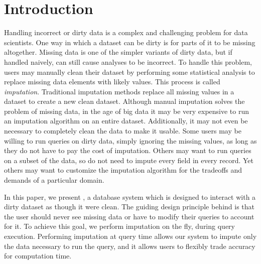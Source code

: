\section{Introduction}

Handling incorrect or dirty data is a complex and challenging problem for data scientists.
One way in which a dataset can be dirty is for parts of it to be missing altogether.
Missing data is one of the simpler variants of dirty data, but if handled naively, can still cause analyses to be incorrect.
To handle this problem, users may manually clean their dataset by performing
some statistical analysis to replace missing data elements with likely values.
This process is called \emph{imputation}.
Traditional imputation methods replace all missing values in a dataset to create a new clean dataset.
Although manual imputation solves the problem of missing data, in the age of big data it may be very expensive to run an imputation algorithm on an entire dataset.
Additionally, it may not even be necessary to completely clean the data to make it usable.
Some users may be willing to run queries on dirty data, simply ignoring the missing values, as long as they do not have to pay the cost of imputation.
Others may want to run queries on a subset of the data, so do not need to impute
every field in every record. Yet others may want to customize the 
imputation algorithm for the tradeoffs and demands of a particular domain.

In this paper, we present \ProjectName{}, a database system which is designed to interact with a dirty dataset as though it were clean.
The guiding design principle behind \ProjectName{} is that the user should never see missing data or have to modify their queries to account for it.
To achieve this goal, we perform imputation on the fly, during query execution.
Performing imputation at query time allows our system to impute only the data necessary to run the query, and it allows users to flexibly trade accuracy for computation time.

